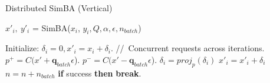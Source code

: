\begin{minipage}{0.9\textwidth}
\begin{algorithm}[H]
    \centering
    \caption{Distributed SimBA (Vertical)}
    \label{alg:simba_vertical}
    \begin{algorithmic}
            \STATE $x'_{i},\ y'_{i}$ = SimBA($x_{i}$, $y_{i}, Q, \alpha, \epsilon, n_{batch}$)
            \begin{ALC@g}
                \STATE Initialize: $\delta_i = 0, x'_{i} = x_i + \delta_i$.
                \FOR {each iteration $n \in [0,\ n_{iter})$}
                    \STATE {}
                    \STATE //\ Concurrent requests across iterations.
                    \STATE $p^+ = C(x{'} + \boldsymbol{q}_{batch}\epsilon$).
                    \STATE $p^- = C(x{'} - \boldsymbol{q}_{batch}\epsilon$).
                            \STATE {} 
                            \STATE {} 
                        \ENDIF
                    \ENDFOR
                    \STATE $\delta_i = proj_{p}(\delta_i)$
                    \STATE $x'_i = x'_i + \delta_i$
                    \STATE $n = n + n_{batch}$
                    \STATE \textbf{if} {success} \textbf{then} {\textbf{break}}.
                \ENDFOR
            \end{ALC@g}
        \ENDFOR
    \end{algorithmic}
\end{algorithm}
\end{minipage}


